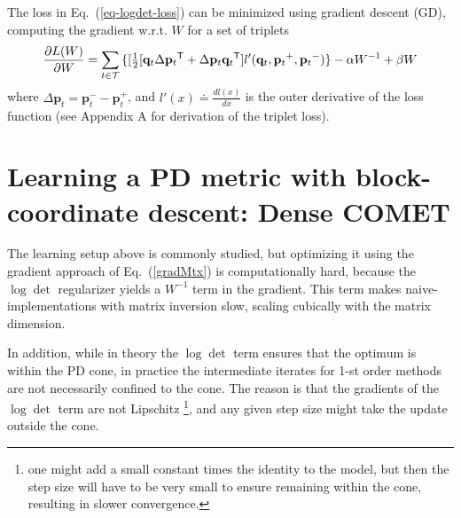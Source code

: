 \documentclass[twoside,11pt]{article}
\newcommand\mat[1]{{#1}}
\renewcommand\vec[1]{\mathbf{#1}}
\newcommand{\T}{{}^\mathsf{T}}
\newcommand{\W}{\mat{W}}
\newcommand{\eqdef}{\doteq}
\newcommand{\q}{{\vec{q}}}
\newcommand{\p}{{\vec{p}}}
\newcommand{\trip}{{t}}
\newcommand{\qt}{{\q_{\trip}}}
\newcommand{\pt}{{\p_{\trip}}}
\newcommand{\triplet}{(\qt, \pt^{+}, \pt^{-})}
\renewcommand{\eqref}[1]{Eq.~(\ref{#1})}
\begin{document}
The loss in \eqref{eq-logdet-loss} can be minimized using gradient descent (GD), computing the gradient w.r.t. $\W$ for a set of triplets
\begin{equation}
  \frac{\partial {L (\W)}}{\partial \W} = \sum\limits_{t\in \cal{T}}{\{
  [\tfrac{1}{2}[\q_{t}\Delta\p_{t}\T + \Delta\p_{t}\q_{t}\T]  }
  {l'}\triplet\} - \alpha \W^{-1} + \beta \W
  \label{gradMtx}
\end{equation}
where $\Delta\p_t = \p_t^- - \p_t^+$, and $l'(x) \eqdef \frac{d{l(x)}}{dx}$ is the outer derivative of the loss function (see Appendix A for derivation of the triplet loss). 
\section{Learning a PD metric with block-coordinate descent: Dense COMET}

The learning setup above is commonly studied, but 
optimizing it using the gradient approach of \eqref{gradMtx} is computationally hard, because the $\log \det$ regularizer yields a $\W^{-1}$ term in the gradient. This term makes naive-implementations with matrix inversion slow, scaling cubically with the matrix dimension. 

In addition, while in theory the $\log \det$ term ensures that the optimum is within the PD cone, in practice the intermediate iterates for 1-st order methods are not necessarily confined to the cone. The reason is that the gradients of the $\log \det$ term are not Lipschitz \footnote{one might add a small constant times the identity to the model, but then the step size will have to be very small to ensure remaining within the cone, resulting in slower convergence.}, and any given step size might take the update outside the cone. 
\end{document}
